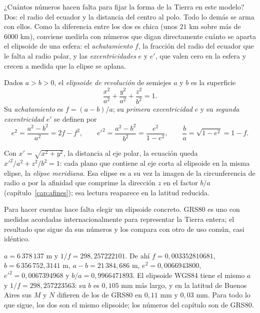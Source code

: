 ¿Cuántos números hacen falta para fijar la forma de la Tierra en este modelo? Dos: el radio del
ecuador y la distancia del centro al polo. Todo lo demás se arma con ellos. Como la diferencia
entre los dos es chica (unos \(21\) km sobre más de \(6000\) km), conviene medirla con números que
digan directamente cuánto se aparta el elipsoide de una esfera: el \emph{achatamiento} \(f\),
la fracción del radio del ecuador que le falta al radio polar, y las \emph{excentricidades}
\(e\) y \(e'\), que valen cero en la esfera y crecen a medida que la elipse se aplana.

\begin{definicion}
Dados \(a>b>0\), el \emph{elipsoide de revolución} de semiejes \(a\) y \(b\) es la superficie
\[
  \frac{x^2}{a^2}+\frac{y^2}{a^2}+\frac{z^2}{b^2}=1 .
\]
Su \emph{achatamiento} es \(f=(a-b)/a\); su \emph{primera excentricidad} \(e\) y su
\emph{segunda excentricidad} \(e'\) se definen por
\[
  e^2=\frac{a^2-b^2}{a^2}=2f-f^2,\qquad e'^2=\frac{a^2-b^2}{b^2}=\frac{e^2}{1-e^2},
  \qquad \frac ba=\sqrt{1-e^2}=1-f .
\]
\end{definicion}

Con \(x'=\sqrt{x^2+y^2}\), la distancia al eje polar, la ecuación queda
\(x'^2/a^2+z^2/b^2=1\): cada plano que contiene al eje corta al elipsoide en la misma elipse,
la \emph{elipse meridiana}. Esa elipse es a su vez la imagen de la circunferencia de radio
\(a\) por la afinidad que comprime la dirección \(z\) en el factor \(b/a\)
(capítulo~\ref{cap:afines}); esa lectura reaparece en la latitud reducida.

Para hacer cuentas hace falta elegir un elipsoide concreto. GRS80 es uno con medidas acordadas
internacionalmente para representar la Tierra entera; el resultado que sigue da sus números y
los compara con otro de uso común, casi idéntico.

\begin{resultado}
\(a=6\,378\,137\) m y \(1/f=298{,}257222101\). De ahí \(f=0{,}003352810681\),
\(b=6\,356\,752{,}3141\) m, \(a-b=21\,384{,}686\) m, \(e^2=0{,}0066943800\),
\(e'^2=0{,}0067394968\) y \(b/a=0{,}9966471893\). El elipsoide WGS84 tiene el mismo \(a\) y
\(1/f=298{,}257223563\): su \(b\) es \(0{,}105\) mm más largo, y en la latitud de Buenos Aires
sus \(M\) y \(N\) difieren de los de GRS80 en \(0{,}11\) mm y \(0{,}03\) mm. Para todo lo que
sigue, los dos son el mismo elipsoide; los números del capítulo son de GRS80.
\end{resultado}

